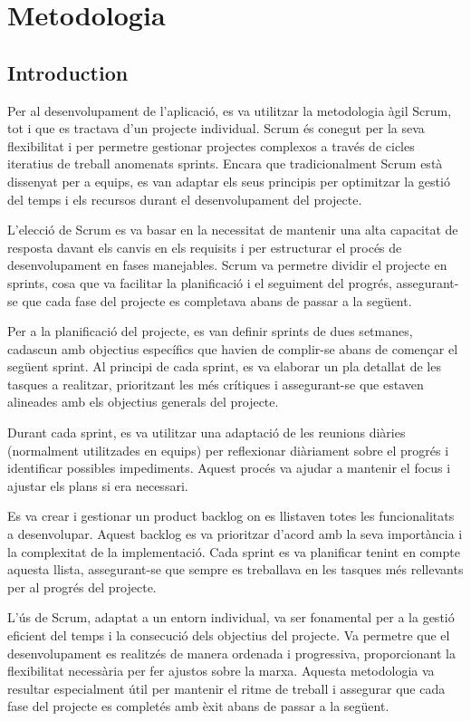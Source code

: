 \documentclass[a4paper,12pt,twoside]{ThesisStyle}
\begin{document}
\chapter{Metodologia}
\label{chp:metodologia}


\section*{Introduction}
\label{subsec: Introduction}

Per al desenvolupament de l'aplicació, es va utilitzar la metodologia àgil Scrum, tot i que es tractava d'un projecte individual. Scrum és conegut per la seva flexibilitat i per permetre gestionar projectes complexos a través de cicles iteratius de treball anomenats sprints. Encara que tradicionalment Scrum està dissenyat per a equips, es van adaptar els seus principis per optimitzar la gestió del temps i els recursos durant el desenvolupament del projecte.

L'elecció de Scrum es va basar en la necessitat de mantenir una alta capacitat de resposta davant els canvis en els requisits i per estructurar el procés de desenvolupament en fases manejables. Scrum va permetre dividir el projecte en sprints, cosa que va facilitar la planificació i el seguiment del progrés, assegurant-se que cada fase del projecte es completava abans de passar a la següent.

Per a la planificació del projecte, es van definir sprints de dues setmanes, cadascun amb objectius específics que havien de complir-se abans de començar el següent sprint. Al principi de cada sprint, es va elaborar un pla detallat de les tasques a realitzar, prioritzant les més crítiques i assegurant-se que estaven alineades amb els objectius generals del projecte.

Durant cada sprint, es va utilitzar una adaptació de les reunions diàries (normalment utilitzades en equips) per reflexionar diàriament sobre el progrés i identificar possibles impediments. Aquest procés va ajudar a mantenir el focus i ajustar els plans si era necessari.

Es va crear i gestionar un product backlog on es llistaven totes les funcionalitats a desenvolupar. Aquest backlog es va prioritzar d’acord amb la seva importància i la complexitat de la implementació. Cada sprint es va planificar tenint en compte aquesta llista, assegurant-se que sempre es treballava en les tasques més rellevants per al progrés del projecte.

L'ús de Scrum, adaptat a un entorn individual, va ser fonamental per a la gestió eficient del temps i la consecució dels objectius del projecte. Va permetre que el desenvolupament es realitzés de manera ordenada i progressiva, proporcionant la flexibilitat necessària per fer ajustos sobre la marxa. Aquesta metodologia va resultar especialment útil per mantenir el ritme de treball i assegurar que cada fase del projecte es completés amb èxit abans de passar a la següent.
\end{document}
